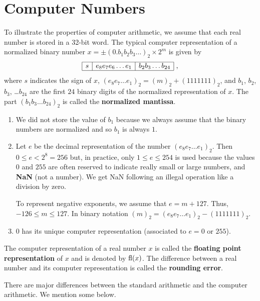 \section{Computer Numbers}

To illustrate the properties of computer arithmetic, we assume that
each real number is stored in a 32-bit word.  The typical computer
representation of a normalized binary number
$x = \pm(0.b_1 b_2 b_3 \ldots )_2 \times 2^m$ is given by
\[
\begin{array}{|c|c|c|}
\hline
s & e_8 e_7 e_6 \ldots e_1 & b_2 b_3 \ldots b_{24} \\
\hline
\end{array} \ ,
\]
where $s$ indicates the sign of $x$,
$(e_8 e_7 \ldots e_1)_2 = (m)_2 + (1111111)_2$, and
$b_1$, $b_2$, $b_3$, \ldots $b_{24}$ are the
first $24$ binary digits of the normalized representation of $x$.
The part $(b_1 b_3 \ldots b_{24})_2$ is called the
{\bfseries normalized mantissa}.

\begin{rmkList}
\begin{enumerate}
\item We did not store the value of $b_1$ because we always assume
that the binary numbers are normalized and so $b_1$ is always $1$.
\item Let $e$ be the decimal representation of the number
$(e_8 e_7 \ldots e_1)_2$.  Then $0 \leq e < 2^8 = 256$ but, in
practice, only $1 \leq e \leq 254$ is used because the values $0$ and
$255$ are often reserved to indicate really small or large numbers,
and {\bfseries NaN} (not a number).  We get NaN following an illegal
operation like a division by zero.

To represent negative exponents, we assume that $e = m + 127$.  Thus,
$-126 \leq m \leq 127$.  In binary notation
$(m)_2 = (e_8 e_7 \ldots e_1)_2 - (1111111)_2$.
\item $0$ has its unique computer representation (associated to $e=0$
or $255$).
\end{enumerate}
\end{rmkList}

The computer representation of a real number $x$ is called the
{\bfseries floating point representation} of $x$ and is denoted by
$\operatorname{fl}(x)$.  The difference between a real number and its computer
representation is called the {\bfseries rounding error}.

There are major differences between the standard arithmetic and the
computer arithmetic.  We mention some below.

